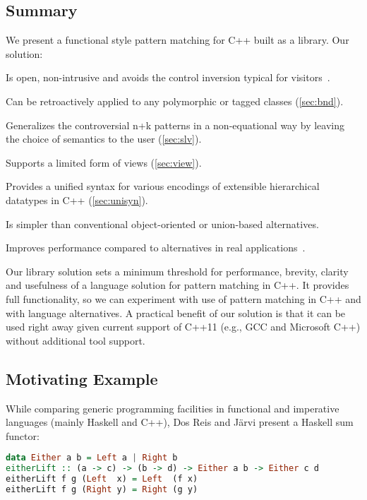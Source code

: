 \subsection{Summary}

We present a functional style pattern matching for C++ built as a library. Our solution:

\begin{compactitem}
\setlength{\itemsep}{0pt}
\setlength{\parskip}{0pt}
  \item Is open, non-intrusive and avoids the control inversion typical for visitors~\cite{TypeSwitch}.
  \item Can be retroactively applied to any polymorphic or tagged classes (\textsection\ref{sec:bnd}).
  \item Generalizes the controversial n+k patterns in a non-equational way by 
        leaving the choice of semantics to the user (\textsection\ref{sec:slv}). 
  \item Supports a limited form of views (\textsection\ref{sec:view}).
  \item Provides a unified syntax for various encodings of extensible 
        hierarchical datatypes in C++ (\textsection\ref{sec:unisyn}).
  \item Is simpler than conventional object-oriented or union-based alternatives.
  \item Improves performance compared to alternatives in real applications~\cite{TypeSwitch}.
\end{compactitem}

\noindent
Our library solution sets a minimum threshold for performance, brevity, clarity 
and usefulness of a language solution for pattern matching in C++. It provides 
full functionality, so we can experiment with use of pattern matching in C++ and 
with language alternatives. A practical benefit of our solution is that it can 
be used right away given current support of C++11 (e.g., GCC and Microsoft C++)  
without additional tool support.

\subsection{Motivating Example}
\label{sec:xmpl}

While comparing generic programming facilities in functional and 
imperative languages (mainly Haskell and C++), Dos Reis and J\"arvi
present a Haskell sum functor\cite{DRJ05}:

\begin{lstlisting}[language=Haskell,keepspaces]
data Either a b = Left a | Right b
eitherLift :: (a -> c) -> (b -> d) -> Either a b -> Either c d
eitherLift f g (Left  x) = Left  (f x)
eitherLift f g (Right y) = Right (g y)
\end{lstlisting}

